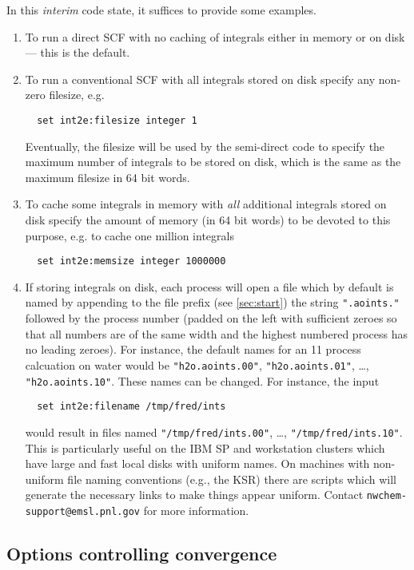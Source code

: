 In this {\em interim} code state, it suffices to provide some
examples.
\begin{enumerate}
\item To run a direct SCF with no caching of integrals either in
  memory or on disk --- this is the default.
\item To run a conventional SCF with all integrals stored on disk
  specify any non-zero filesize, e.g.
\begin{verbatim}
  set int2e:filesize integer 1
\end{verbatim}
  Eventually, the filesize will be used by the semi-direct code to
  specify the maximum number of integrals to be stored on disk, which
  is the same as the maximum filesize in 64 bit words.
\item To cache some integrals in memory with {\em all} additional
  integrals stored on disk specify the amount of memory (in 64 bit
  words) to be devoted to this purpose, e.g. to cache one million
  integrals 
\begin{verbatim}
  set int2e:memsize integer 1000000
\end{verbatim}
\item If storing integrals on disk, each process will open a file which
  by default is named by appending to the file prefix (see
  \ref{sec:start}) the string \verb+".aoints."+ followed by the
  process number (padded on the left with sufficient zeroes so that
  all numbers are of the same width and the highest numbered process
  has no leading zeroes).  For instance, the default names for an 11
  process calcuation on water would be \verb+"h2o.aoints.00"+,
  \verb+"h2o.aoints.01"+, \ldots, \verb+"h2o.aoints.10"+.  These names
  can be changed.  For instance, the input
\begin{verbatim}
  set int2e:filename /tmp/fred/ints
\end{verbatim}
  would result in files named \verb+"/tmp/fred/ints.00"+, \ldots,
  \verb+"/tmp/fred/ints.10"+.  This is particularly useful on the IBM
  SP and workstation clusters which have large and fast local disks
  with uniform names.  On machines with non-uniform file naming
  conventions (e.g., the KSR) there are scripts which will generate
  the necessary links to make things appear uniform.  Contact
  \verb+nwchem-support@emsl.pnl.gov+ for more information.
\end{enumerate}

\subsection{Options controlling convergence}
\label{sec:scfconv}

